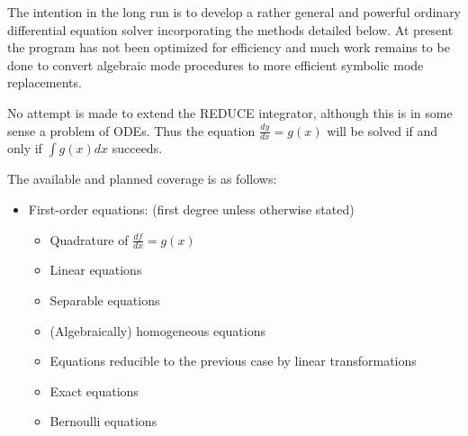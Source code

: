 The intention in the long run is to develop a rather general and
powerful ordinary differential equation solver incorporating the
methods detailed below.  At present the program has not been optimized
for efficiency and much work remains to be done to convert algebraic
mode procedures to more efficient symbolic mode replacements.

No attempt is made to extend the REDUCE integrator, although this is
in some sense a problem of ODEs.  Thus the equation $\frac{dy}{dx} = g(x)$ will
be solved if and only if $\int g(x) dx$ succeeds.

The available and planned coverage is as follows:

\begin{itemize}
\item First-order equations: (first degree unless otherwise stated)

\begin{itemize}
\item Quadrature of $\frac{df}{dx} = g(x)$
\item Linear equations
\item Separable equations
\item (Algebraically) homogeneous equations
\item Equations reducible to the previous case by linear transformations
\item Exact equations
\item Bernoulli equations
\end{itemize}


\end{itemize}
